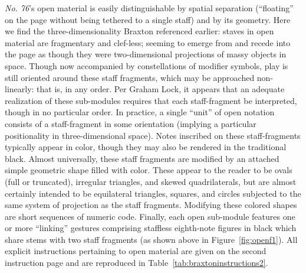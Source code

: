         \textit{No. 76}'s open material is easily distinguishable by spatial separation (``floating'' on the page without being tethered to a single staff) and by its geometry. Here we find the three-dimensionality Braxton referenced earlier: staves in open material are fragmentary and clef-less; seeming to emerge from and recede into the page as though they were two-dimensional projections of massy objects in space. Though now accompanied by constellations of modifier symbols, play is still oriented around these staff fragments, which may be approached non-linearly: that is, in any order. Per Graham Lock, it appears that an adequate realization of these sub-modules requires that each staff-fragment be interpreted, though in no particular order.\autocite[Postscript 3]{Lock_1989} In practice, a single ``unit'' of open notation consists of a staff-fragment in some orientation (implying a particular positionality in three-dimensional space). Notes inscribed on these staff-fragments typically appear in color, though they may also be rendered in the traditional black. Almost universally, these staff fragments are modified by an attached simple geometric shape filled with color. These appear to the reader to be ovals (full or truncated), irregular triangles, and skewed quadrilaterals, but are almost certainly intended to be equilateral triangles, squares, and circles subjected to the same system of projection as the staff fragments. Modifying these colored shapes are short sequences of numeric code. Finally, each open sub-module features one or more ``linking'' gestures comprising staffless eighth-note figures in black which share stems with two staff fragments (as shown above in Figure~\ref{fig:openf1}). All explicit instructions pertaining to open material are given on the second instruction page and are reproduced in Table~\ref{tab:braxtoninstructions2}. 

